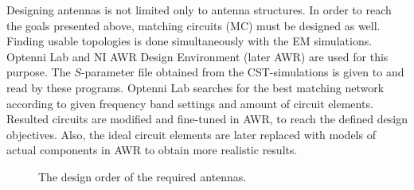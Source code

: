 Designing antennas is not limited only to antenna structures. In order to reach the goals presented above, matching circuits (MC) must be designed as well. Finding usable topologies is done simultaneously with the EM simulations. Optenni Lab \cite{optenni} and NI AWR Design Environment \cite{awr} (later AWR) are used for this purpose. The $S$-parameter file obtained from the CST-simulations is given to and read by these programs. Optenni Lab searches for the best matching network according to given frequency band settings and amount of circuit elements. Resulted circuits are modified and fine-tuned in AWR, to reach the defined design objectives. Also, the ideal circuit elements are later replaced with models of actual components in AWR to obtain more realistic results.

\begin{figure}[H]
    \centering
        \caption{The design order of the required antennas.}
        \label{fig:ant_order}
\end{figure} 
    
